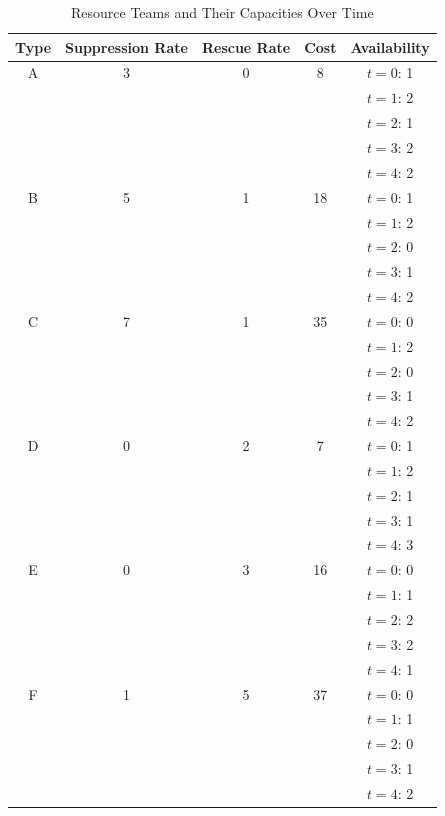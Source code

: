 \begin{table}[!htb]
\centering
\footnotesize
\setlength{\tabcolsep}{4pt}
\caption{Resource Teams and Their Capacities Over Time}
\label{tab:resource-teams}
\begin{tabular}{@{} c c c c c @{}}
\toprule
\textbf{Type} & \textbf{Suppression Rate} & \textbf{Rescue Rate} & \textbf{Cost} & \textbf{Availability} \\
\midrule
A & 3 & 0  & 8  & $t=0$: 1 \\
  &   &    &    & $t=1$: 2 \\
  &   &    &    & $t=2$: 1 \\
  &   &    &    & $t=3$: 2 \\
  &   &    &    & $t=4$: 2 \\
\midrule
B & 5 & 1  & 18 & $t=0$: 1 \\
  &   &    &    & $t=1$: 2 \\
  &   &    &    & $t=2$: 0 \\
  &   &    &    & $t=3$: 1 \\
  &   &    &    & $t=4$: 2 \\
\midrule
C & 7 & 1  & 35 & $t=0$: 0 \\
  &   &    &    & $t=1$: 2 \\
  &   &    &    & $t=2$: 0 \\
  &   &    &    & $t=3$: 1 \\
  &   &    &    & $t=4$: 2 \\
\midrule
D & 0 & 2  & 7  & $t=0$: 1 \\
  &   &    &    & $t=1$: 2 \\
  &   &    &    & $t=2$: 1 \\
  &   &    &    & $t=3$: 1 \\
  &   &    &    & $t=4$: 3 \\
\midrule
E & 0 & 3  & 16 & $t=0$: 0 \\
  &   &    &    & $t=1$: 1 \\
  &   &    &    & $t=2$: 2 \\
  &   &    &    & $t=3$: 2 \\
  &   &    &    & $t=4$: 1 \\
\midrule
F & 1 & 5  & 37 & $t=0$: 0 \\
  &   &    &    & $t=1$: 1 \\
  &   &    &    & $t=2$: 0 \\
  &   &    &    & $t=3$: 1 \\
  &   &    &    & $t=4$: 2 \\
\bottomrule
\end{tabular}
\end{table}

